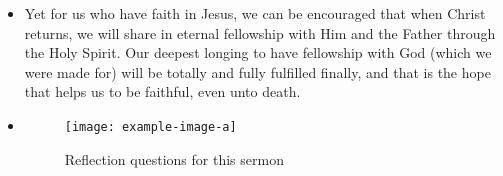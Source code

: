 \begin{itemize}
{  emotional torment described is just a way for us to scratch the surface of
  the depth of this torment.}
  \item{Yet for us who have faith in Jesus, we can be encouraged that when
  Christ returns, we will share in eternal fellowship with Him and the Father
  through the Holy Spirit.  Our deepest longing to have fellowship with God
  (which we were made for) will be totally and fully fulfilled finally, and
  that is the hope that helps us to be faithful, even unto death.  }
  \item{\begin{figure}[H]
    \centering
    \texttt{[image: example-image-a]}
    \caption[]{Reflection questions for this sermon}
    \label{}
  \end{figure}}
\end{itemize}